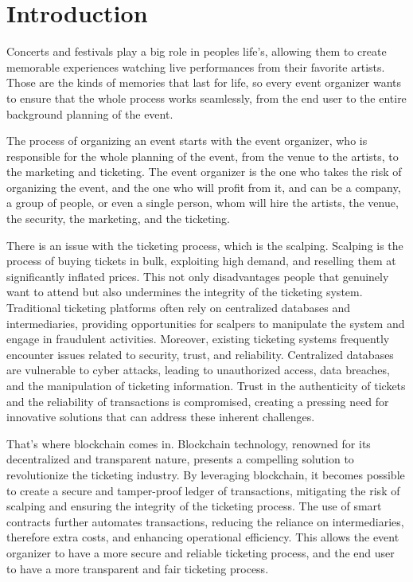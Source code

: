 \chapter{Introduction}

Concerts and festivals play a big role in peoples life's, allowing them to create memorable experiences watching live performances from their favorite artists. Those are the kinds of memories that last for life, so every event organizer wants to ensure that the whole process works seamlessly, from the end user to the entire background planning of the event.

The process of organizing an event starts with the event organizer, who is responsible for the whole planning of the event, from the venue to the artists, to the marketing and ticketing. The event organizer is the one who takes the risk of organizing the event, and the one who will profit from it, and can be a company, a group of people, or even a single person, whom will hire the artists, the venue, the security, the marketing, and the ticketing.

There is an issue with the ticketing process, which is the scalping. Scalping is the process of buying tickets in bulk, exploiting high demand, and reselling them at significantly inflated prices. This not only disadvantages people that genuinely want to attend but also undermines the integrity of the ticketing system. Traditional ticketing platforms often rely on centralized databases and intermediaries, providing opportunities for scalpers to manipulate the system and engage in fraudulent activities.
Moreover, existing ticketing systems frequently encounter issues related to security, trust, and reliability. Centralized databases are vulnerable to cyber attacks, leading to unauthorized access, data breaches, and the manipulation of ticketing information. Trust in the authenticity of tickets and the reliability of transactions is compromised, creating a pressing need for innovative solutions that can address these inherent challenges.

That's where blockchain comes in. Blockchain technology, renowned for its decentralized and transparent nature, presents a compelling solution to revolutionize the ticketing industry. By leveraging blockchain, it becomes possible to create a secure and tamper-proof ledger of transactions, mitigating the risk of scalping and ensuring the integrity of the ticketing process. The use of smart contracts further automates transactions, reducing the reliance on intermediaries, therefore extra costs, and enhancing operational efficiency. This allows the event organizer to have a more secure and reliable ticketing process, and the end user to have a more transparent and fair ticketing process.





